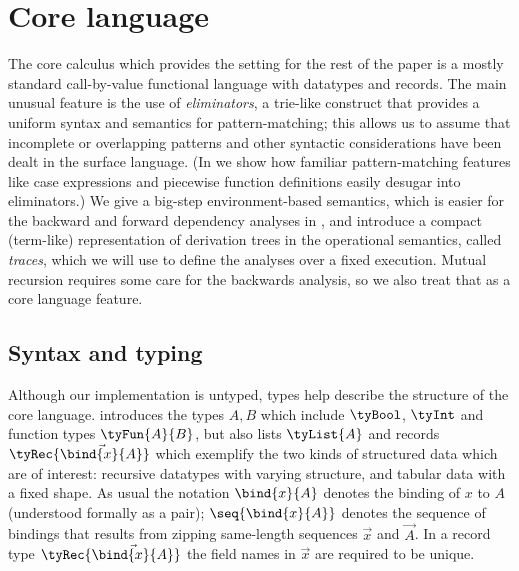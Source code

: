 \section{Core language}
\label{sec:core-language}

The core calculus which provides the setting for the rest of the paper is a mostly standard call-by-value functional language with datatypes and records. The main unusual feature is the use of \emph{eliminators}, a trie-like construct that provides a uniform syntax and semantics for pattern-matching; this allows us to assume that incomplete or overlapping patterns and other syntactic considerations have been dealt in the surface language. (In  we show how familiar pattern-matching features like case expressions and piecewise function definitions easily desugar into eliminators.) We give a big-step environment-based semantics, which is easier for the backward and forward dependency analyses in , and introduce a compact (term-like) representation of derivation trees in the operational semantics, called \emph{traces}, which we will use to define the analyses over a fixed execution. Mutual recursion requires some care for the backwards analysis, so we also treat that as a core language feature.

\subsection{Syntax and typing}
\label{sec:core-language:syntax-typing}

Although our implementation is untyped, types help describe the structure of the core language.  introduces the types $A, B$ which include $\tyBool$, $\tyInt$ and function types $\tyFun{A}{B}$, but also lists $\tyList{A}$ and records $\tyRec{\vec{\bind{x}{A}}}$ which exemplify the two kinds of structured data which are of interest: recursive datatypes with varying structure, and tabular data with a fixed shape. As usual the notation $\bind{x}{A}$ denotes the binding of $x$ to $A$ (understood formally as a pair); $\seq{\bind{x}{A}}$ denotes the sequence of bindings that results from zipping same-length sequences $\vec{x}$ and $\vec{A}$. In a record type $\tyRec{\vec{\bind{x}{A}}}$ the field names in $\vec{x}$ are required to be unique.



